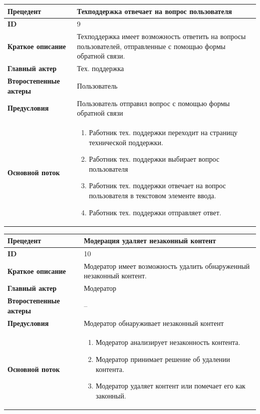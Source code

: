 \begin{center}
  \begin{tabular}{|l|p{9cm}|}
  \hline
  \textbf{Прецедент} & Техподдержка отвечает на вопрос пользователя \\
  \hline
  \textbf{ID} & 9 \\
  \hline
  \textbf{Краткое описание} & Техподдержка имеет возможность ответить на вопросы пользователей, отправленные с помощью формы обратной связи. \\
  \hline
  \textbf{Главный актер} & Тех. поддержка \\
  \hline
  \textbf{Второстепенные актеры} & Пользователь \\
  \hline
  \textbf{Предусловия} & Пользователь отправил вопрос с помощью формы обратной связи \\
  \hline
  \textbf{Основной поток} & \begin{enumerate}
    \item Работник тех. поддержки переходит на страницу технической поддержки.
    \item Работник тех. поддержки выбирает вопрос пользователя
    \item Работник тех. поддержки отвечает на вопрос пользователя в текстовом элементе ввода.
    \item Работник тех. поддержки отправляет ответ.
  \end{enumerate} \\
  \hline
\end{tabular}
\end{center}

\begin{center}
  \begin{tabular}{|l|p{9cm}|}
  \hline
  \textbf{Прецедент} & Модерация удаляет незаконный контент \\
  \hline
  \textbf{ID} & 10 \\
  \hline
  \textbf{Краткое описание} & Модератор имеет возможность удалить обнаруженный незаконный контент. \\
  \hline
  \textbf{Главный актер} & Модератор \\
  \hline
  \textbf{Второстепенные актеры} & --  \\
  \hline
  \textbf{Предусловия} & Модератор обнаруживает незаконный контент \\
  \hline
  \textbf{Основной поток} & \begin{enumerate}
    \item Модератор анализирует незаконность контента.
    \item Модератор принимает решение об удалении контента.
    \item Модератор удаляет контент или помечает его как законный.
  \end{enumerate} \\
  \hline
\end{tabular}
\end{center}




